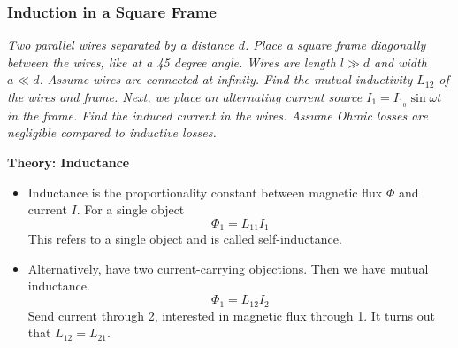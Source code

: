 \documentclass[11pt, a4paper]{article}
\begin{document}
\subsubsection{Induction in a Square Frame}
\textit{Two parallel wires separated by a distance $ d $. Place a square frame diagonally between the wires, like at a 45 degree angle. Wires are length $ l \gg d $ and width $ a \ll d $. Assume wires are connected at infinity. Find the mutual inductivity $ L_{12} $ of the wires and frame. Next, we place an alternating current source $ I_{1} = I_{1_{0}}\sin \omega t $ in the frame. Find the induced current in the wires. Assume Ohmic losses are negligible compared to inductive losses.}

\textbf{Theory: Inductance}
\begin{itemize}
	\item Inductance is the proportionality constant between magnetic flux $ \Phi $ and current $ I $. For a single object
	\begin{equation*}
		\Phi_{1} = L_{11} I_{1}
	\end{equation*}
	This refers to a single object and is called self-inductance. 
	
	\item Alternatively, have two current-carrying objections. Then we have mutual inductance.
	\begin{equation*}
		\Phi_{1} = L_{12}I_{2}
	\end{equation*}
	Send current through 2, interested in magnetic flux through 1. It turns out that $ L_{12} = L_{21} $.
	
\end{itemize}
\end{document}
